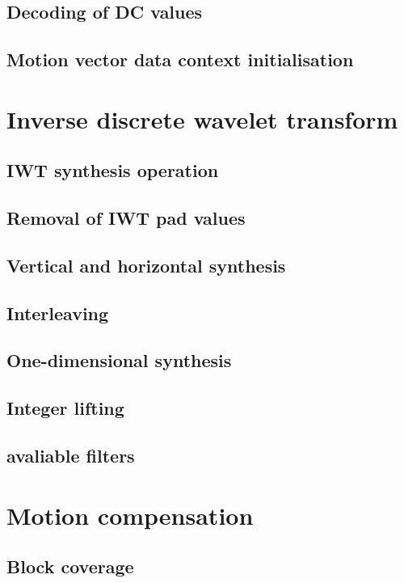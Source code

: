 \subsection{Decoding of DC values}
\subsection{Motion vector data context initialisation}

\clearpage
\section{Inverse discrete wavelet transform}
\subsection{IWT synthesis operation}
\subsection{Removal of IWT pad values}
\subsection{Vertical and horizontal synthesis}
\subsection{Interleaving}
\subsection{One-dimensional synthesis}
\subsection{Integer lifting}
\subsection{avaliable filters}



\clearpage
\section{Motion compensation}
\subsection{Block coverage}
